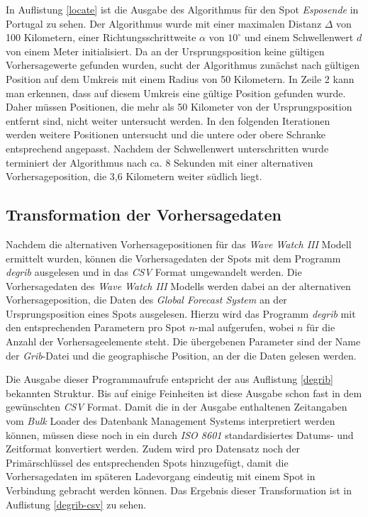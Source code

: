 

In Auflistung \ref{locate} ist die Ausgabe des Algorithmus für den
Spot \textit{Esposende} in Portugal zu sehen. Der Algorithmus wurde
mit einer maximalen Distanz $\Delta$ von 100 Kilometern, einer
Richtungsschrittweite $\alpha$ von $10^{\circ}$ und einem
Schwellenwert $d$ von einem Meter initialisiert. Da an der
Ursprungsposition keine gültigen Vorhersagewerte gefunden wurden,
sucht der Algorithmus zunächst nach gültigen Position auf dem Umkreis
mit einem Radius von 50 Kilometern. In Zeile 2 kann man erkennen, dass
auf diesem Umkreis eine gültige Position gefunden wurde. Daher müssen
Positionen, die mehr als 50 Kilometer von der Ursprungsposition
entfernt sind, nicht weiter untersucht werden. In den folgenden
Iterationen werden weitere Positionen untersucht und die untere oder
obere Schranke entsprechend angepasst. Nachdem der Schwellenwert
unterschritten wurde terminiert der Algorithmus nach ca. 8 Sekunden
mit einer alternativen Vorhersageposition, die 3,6 Kilometern weiter
südlich liegt.

\subsection{Transformation der Vorhersagedaten}
Nachdem die alternativen Vorhersagepositionen für das \textit{Wave
  Watch III} Modell ermittelt wurden, können die Vorhersagedaten der
Spots mit dem Programm \textit{degrib} ausgelesen und in das
\textit{CSV} Format umgewandelt werden. Die Vorhersagedaten des
\textit{Wave Watch III} Modells werden dabei an der alternativen
Vorhersageposition, die Daten des \textit{Global Forecast System} an
der Ursprungsposition eines Spots ausgelesen. Hierzu wird das Programm
\textit{degrib} mit den entsprechenden Parametern pro Spot $n$-mal
aufgerufen, wobei $n$ für die Anzahl der Vorhersageelemente steht. Die
übergebenen Parameter sind der Name der \textit{Grib}-Datei und die
geographische Position, an der die Daten gelesen werden.

Die Ausgabe dieser Programmaufrufe entspricht der aus Auflistung
\ref{degrib} bekannten Struktur. Bis auf einige Feinheiten ist diese
Ausgabe schon fast in dem gewünschten \textit{CSV} Format. Damit die
in der Ausgabe enthaltenen Zeitangaben vom \textit{Bulk} Loader des
Datenbank Management Systems interpretiert werden können, müssen diese
noch in ein durch \textit{ISO 8601} standardisiertes Datums- und
Zeitformat konvertiert werden. Zudem wird pro Datensatz noch der
Primärschlüssel des entsprechenden Spots hinzugefügt, damit die
Vorhersagedaten im späteren Ladevorgang eindeutig mit einem Spot in
Verbindung gebracht werden können. Das Ergebnis dieser Transformation
ist in Auflistung \ref{degrib-csv} zu sehen.

